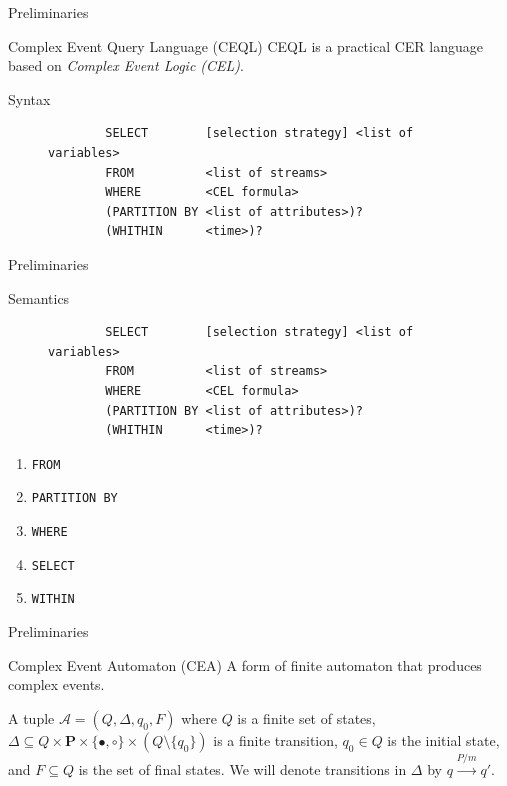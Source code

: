 \documentclass[xcolor=pdftex,dvipsnames,table]{beamer}
\newcommand{\code}[1]{\texttt{#1}}
\begin{document}

\begin{frame}[fragile]{Preliminaries}
  \begin{block}{Complex Event Query Language (CEQL)}
    CEQL is a practical CER language based on \emph{Complex Event Logic (CEL)}.
  \end{block}
  \begin{block}{Syntax}
    \begin{figure}[H]
      \begin{verbatim}
        SELECT        [selection strategy] <list of variables>
        FROM          <list of streams>
        WHERE         <CEL formula>
        (PARTITION BY <list of attributes>)?
        (WHITHIN      <time>)?
      \end{verbatim}
    \end{figure}
  \end{block}
\end{frame}

\begin{frame}[fragile]{Preliminaries}
  \begin{block}{Semantics}
    \begin{figure}[H]
      \begin{verbatim}
        SELECT        [selection strategy] <list of variables>
        FROM          <list of streams>
        WHERE         <CEL formula>
        (PARTITION BY <list of attributes>)?
        (WHITHIN      <time>)?
      \end{verbatim}
    \end{figure}
    \begin{enumerate}
      \item \code{FROM}
      \item \code{PARTITION BY}
      \item \code{WHERE}
      \item \code{SELECT}
      \item \code{WITHIN}
    \end{enumerate}
  \end{block}
\end{frame}


\begin{frame}[fragile]{Preliminaries}
  \begin{block}{Complex Event Automaton (CEA)}
     A form of finite automaton that produces complex events.
  \end{block}
  \begin{definition}
  A tuple $\mathcal{A} = (Q, \Delta, q_{0}, F)$ where $Q$ is a finite set of states, $\Delta \subseteq Q \times \textbf{P} \times \{\bullet, \circ\} \times (Q \setminus \{ q_{0} \})$ is a finite transition, $q_{0} \in Q$ is the initial state, and $F \subseteq Q$ is the set of final states. We will denote transitions in $\Delta$ by $q \xrightarrow[]{P/m} q'$.
  \end{definition}
\end{frame}
\end{document}
